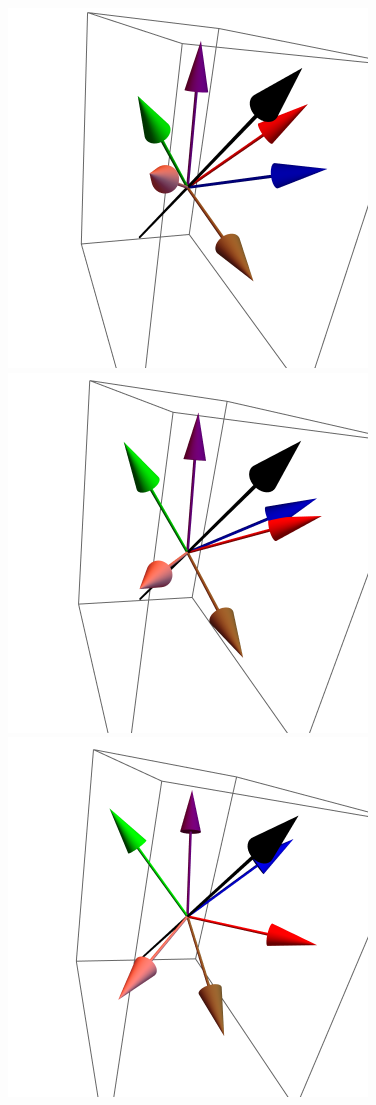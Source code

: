 \documentclass{article}
\begin{document}
\begin{figure}[ht]
\centering
\includegraphics[scale=0.37]{HVariedData/Pictures/101Dec1.png}
\includegraphics[scale=0.37]{HVariedData/Pictures/101Dec79.png}
\includegraphics[scale=0.37]{HVariedData/Pictures/101Dec125.png}

\end{figure}
\end{document}
